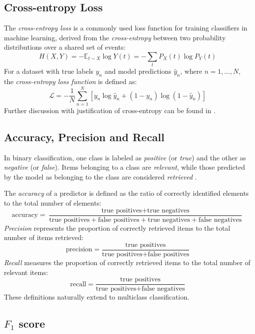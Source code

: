 \subsection{Cross-entropy Loss}

The \emph{cross-entropy loss} is a commonly used loss function for training classifiers in machine learning, derived from the \emph{cross-entropy} between two probability distributions over a shared set of events: \[H(X, Y) = -\mathbb{E}_{t\sim X}\log Y(t) = -\sum_t P_X(t)\log P_Y(t)\] For a dataset with true labels $y_n$ and model predictions $\hat{y}_n$, where $n=1,\ldots,N$, the \emph{cross-entropy loss function} is defined as: \[\mathcal{L} = -\frac{1}{N}\sum_{n=1}^N\left[y_n\log \hat{y}_n + (1 - y_n)\log(1 - \hat{y}_n)\right]\] Further discussion with justification of cross-entropy can be found in \cite[p. 73--75, 178]{Goodfellow2016}.

\subsection{Accuracy, Precision and Recall}

In binary classification, one class is labeled as \emph{positive} (or \emph{true}) and the other as \emph{negative} (or \emph{false}). Items belonging to a class are \emph{relevant}, while those predicted by the model as belonging to the class are considered \emph{retrieved} \cite[p. 76]{Roelleke2022}.

The \emph{accuracy} of a predictor is defined as the ratio of correctly identified elements to the total number of elements: \[\textrm{accuracy} = \frac{\textrm{true positives} + \textrm{true negatives}}{\textrm{true positives} + \textrm{false positives} +\textrm{true negatives} + \textrm{false negatives}}\] \emph{Precision} represents the proportion of correctly retrieved items to the total number of items retrieved: \[\textrm{precision} = \frac{\textrm{true positives}}{\textrm{true positives} + \textrm{false positives}}\] \emph{Recall} measures the proportion of correctly retrieved items to the total number of relevant items: \[\textrm{recall} = \frac{\textrm{true positives}}{\textrm{true positives} + \textrm{false negatives}}\] These definitions naturally extend to multiclass classification.

\subsection{$F_1$ score}

